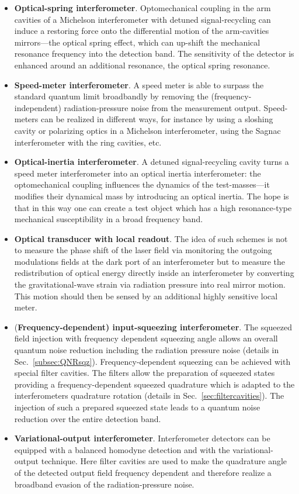 \begin{itemize}
\item \textbf{Optical-spring interferometer}. Optomechanical coupling in the arm cavities of a
Michelson interferometer with detuned signal-recycling can induce
a restoring force onto the differential motion of the arm-cavities
mirrors---the optical spring effect, which
can up-shift the mechanical resonance frequency into the detection
band. The sensitivity of the detector is enhanced around
an additional resonance, the optical spring resonance.
\item \textbf{Speed-meter interferometer}. A speed
meter is able to surpass the standard quantum limit broadbandly by
removing the (frequency-independent) radiation-pressure noise from
the measurement output. Speed-meters can be realized in different ways,
for instance by using a sloshing cavity or polarizing optics in a Michelson interferometer,
using the Sagnac interferometer with the ring cavities, etc.
\item \textbf{Optical-inertia interferometer}. A
detuned signal-recycling cavity turns a speed meter interferometer
into an optical inertia
interferometer: the optomechanical
coupling influences the dynamics of the test-masses---it modifies
their dynamical mass by introducing an optical inertia. The hope is that in this way one
can create a test object which has a high resonance-type
mechanical susceptibility in a broad frequency band.
\item \textbf{Optical transducer with local readout}. The idea of such schemes is not to measure the
phase shift of the laser field via monitoring the outgoing
modulations fields at the dark port of an interferometer but to
measure the redistribution of optical energy directly inside an
interferometer by converting the gravitational-wave strain via
radiation pressure into real mirror motion. This motion should
then be sensed by an additional highly sensitive local meter.
\item (\textbf{Frequency-dependent) input-squeezing interferometer}. The squeezed field
injection with frequency dependent squeezing angle allows an
overall quantum noise reduction including the radiation pressure
noise (details in Sec.~\ref{subsec:QNRsqz}). Frequency-dependent squeezing can be achieved with special filter cavities.
The filters allow the preparation of squeezed states providing a frequency-dependent
squeezed quadrature which is adapted to the interferometers
quadrature rotation (details in Sec.~\ref{sec:filtercavities}). The injection of such a prepared squeezed
state leads to a quantum noise reduction over the entire detection
band.
\item \textbf{Variational-output interferometer}. Interferometer detectors can be equipped
with a balanced homodyne detection and with the
variational-output technique. Here filter
cavities are used to make the quadrature angle of the detected
output field frequency dependent and therefore realize a broadband
evasion of the radiation-pressure noise.
\end{itemize}
